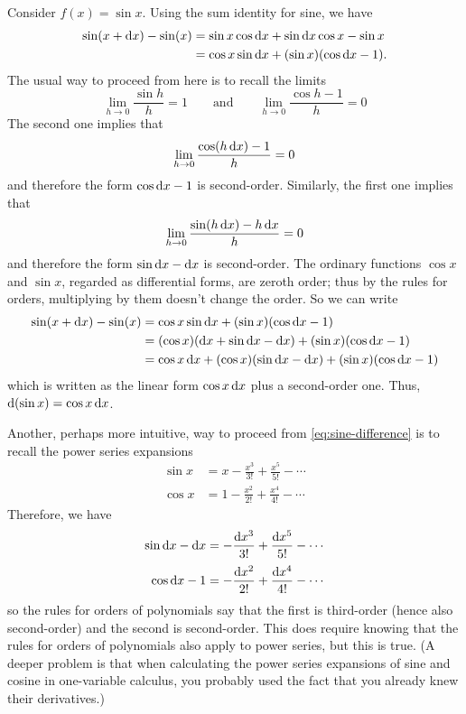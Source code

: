 \documentclass[12pt]{amsart}
\begin{document}
\begin{eg}
  Consider $f(x) = \sin x$.
  Using the sum identity for sine, we have
  \begin{align}
    \sin(x+\mathrm{d} x) - \sin (x)
    &= \sin x \cos \mathrm{d} x + \sin \mathrm{d} x \cos x - \sin x \notag\\
    &= \cos x \sin \mathrm{d} x + (\sin x) (\cos \mathrm{d} x - 1).\label{eq:sine-difference}
  \end{align}
  The usual way to proceed from here is to recall the limits
  \[ \lim_{h\to 0} \frac{\sin h}{h} = 1 \qquad\text{and}\qquad
  \lim_{h\to 0} \frac{\cos h - 1}{h} = 0 \]
  The second one implies that
  \[ \lim_{h\to 0} \frac{\cos (h\,\mathrm{d} x) - 1}{h} = 0 \]
  and therefore the form $\cos \mathrm{d} x - 1$ is second-order.
  Similarly, the first one implies that
  \[ \lim_{h\to 0} \frac{\sin (h\, \mathrm{d} x) - h \, \mathrm{d} x}{h} = 0 \]
  and therefore the form $\sin \mathrm{d} x - \mathrm{d} x$ is second-order.
  The ordinary functions $\cos x$ and $\sin x$, regarded as differential forms, are zeroth order; thus by the rules for orders, multiplying by them doesn't change the order.
  So we can write
  \begin{align*}
    \sin(x+\mathrm{d} x) - \sin (x)
    &= \cos x \sin \mathrm{d} x + (\sin x) (\cos \mathrm{d} x - 1)\\
    &= (\cos x )(\mathrm{d} x  + \sin \mathrm{d} x - \mathrm{d} x) + (\sin x) (\cos \mathrm{d} x - 1)\\
    &= \cos x \,\mathrm{d} x + (\cos x) (\sin \mathrm{d} x - \mathrm{d} x) + (\sin x) (\cos \mathrm{d} x - 1)
  \end{align*}
  which is written as the linear form $\cos x \,\mathrm{d} x$ plus a second-order one.
  Thus, $\mathrm{d}(\sin x) = \cos x \,\mathrm{d} x$.

  Another, perhaps more intuitive, way to proceed from \cref{eq:sine-difference} is to recall the power series expansions
  \begin{align*}
    \sin x &= x - \frac{x^3}{3!} + \frac{x^5}{5!} - \cdots\\[2pt]
    \cos x &= 1 - \frac{x^2}{2!} + \frac{x^4}{4!} - \cdots
  \end{align*}
  Therefore, we have
  \begin{align*}
    \sin \mathrm{d} x - \mathrm{d} x &= - \frac{\mathrm{d} x^3}{3!} + \frac{\mathrm{d} x^5}{5!} - \cdots\\[2pt]
    \cos \mathrm{d} x - 1 &= - \frac{\mathrm{d} x^2}{2!} + \frac{\mathrm{d} x^4}{4!} - \cdots
  \end{align*}
  so the rules for orders of polynomials say that the first is third-order (hence also second-order) and the second is second-order.
  This does require knowing that the rules for orders of polynomials also apply to power series, but this is true.
  (A deeper problem is that when calculating the power series expansions of sine and cosine in one-variable calculus, you probably used the fact that you already knew their derivatives.)
\end{eg}
\end{document}
